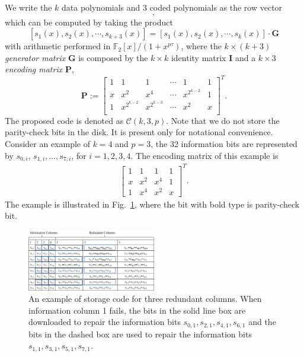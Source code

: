 \documentclass[conference]{IEEEtran}
\begin{document}
We write the $k$ data polynomials and $3$ coded polynomials as the row vector
\begin{equation}
[s_1(x),s_2(x),\cdots,s_{k+3}(x)],
\label{eq:data_clm}
\end{equation}
which can be computed by taking the product
\[
[s_1(x),s_2(x),\cdots,s_{k+3}(x)]= [s_1(x),s_2(x),\cdots,s_{k}(x)] \cdot \mathbf{G}
\]
with arithmetic performed in $\mathbb{F}_2[x]/(1+x^{p\tau})$,
where the $k\times (k+3)$ \emph{generator matrix} $\mathbf{G}$ is composed by the $k\times k$ identity matrix $\mathbf{I}$ and a $k\times 3$ \emph{encoding matrix} $\mathbf{P}$,
\[
\mathbf{P}:=
\begin{bmatrix}
 1&1&1 & \cdots & 1 &1\\
 x & x^{2} & x^{4}& \cdots & x^{2^{k-2}}&1\\
 1&x^{2^{k-2}}& x^{2^{k-3}}& \cdots & x^{2} & x \\
 \end{bmatrix}^T.
\label{matrixp}
\]
The proposed code is denoted as $\mathcal{C}(k,3,p)$. Note that we do not store the parity-check bits in the disk. It is present only for notational convenience. Consider an example of $k=4$ and $p=3$, the 32 information bits are represented by $s_{0,i}$, $s_{1,i}, \ldots, s_{7,i}$, for $i=1,2,3,4$. The encoding matrix of this example is
\begin{align*}
\begin{bmatrix}
1 & 1 & 1 & 1\\
x & x^2 & x^4 & 1 \\
1 & x^4 & x^2 & x
\end{bmatrix}^T.
\end{align*}
The example is illustrated in Fig.~\ref{example}, where the bit with bold type is parity-check bit.

\begin{figure}
\centering
\includegraphics[width=0.5\textwidth]{example}
\caption{An example of storage code for three redundant columns. When information column 1 fails, the bits in the solid line box are downloaded to repair the information bits $s_{0,1},s_{2,1},s_{4,1},s_{6,1}$ and the bits in the dashed box are used to repair the information bits $s_{1,1},s_{3,1},s_{5,1},s_{7,1}$.}
\label{example}
\end{figure}
\end{document}
